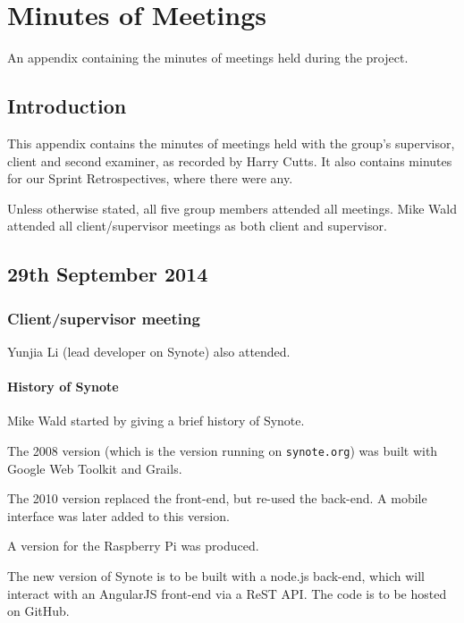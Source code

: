 \chapter{Minutes of Meetings} \label{Chapter:Minutes of Meetings}

\begin{preamble}
	An appendix containing the minutes of meetings held during the project.
\end{preamble}

\section{Introduction}

This appendix contains the minutes of meetings held with the group's supervisor, client and second examiner, as recorded by Harry Cutts. It also contains minutes for our Sprint Retrospectives, where there were any.

Unless otherwise stated, all five group members attended all meetings. Mike Wald attended all client/supervisor meetings as both client and supervisor.

\section{29th September 2014}\label{Minutes:2014-09-29}

\subsection{Client/supervisor meeting}

Yunjia Li (lead developer on Synote) also attended.

\subsubsection{History of Synote}

Mike Wald started by giving a brief history of Synote.

The 2008 version (which is the version running on \texttt{synote.org})
was built with Google Web Toolkit and Grails.

The 2010 version replaced the front-end, but re-used the back-end. A
mobile interface was later added to this version.

A version for the Raspberry Pi was produced.

The new version of Synote is to be built with a node.js back-end, which
will interact with an AngularJS front-end via a ReST API. The code is to
be hosted on GitHub.

